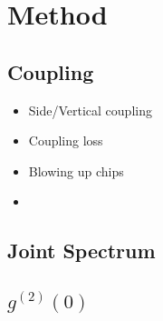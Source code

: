 \section{Method}
\subsection{Coupling}
\begin{itemize}
\item Side/Vertical coupling
\item Coupling loss
\item Blowing up chips
\item 
\end{itemize}
\subsection{Joint Spectrum}
\subsection{$g^{(2)}(0)$}